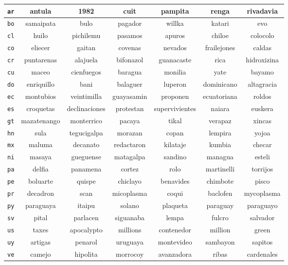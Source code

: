 \begin{tabular}{lcccccc}
    \toprule
    \texttt{ar} & antula & 1982 & cuit & pampita & renga & rivadavia \\ 
    \midrule
    \texttt{bo} & samaipata & bulo & pagador & willka & katari & evo \\ 
    \midrule
    \texttt{cl} & huilo & pichilemu & pasamos & apuros & chiloe & colocolo \\ 
    \midrule
    \texttt{co} & eliecer & gaitan & covenas & nevados & frailejones & caldas \\ 
    \midrule
    \texttt{cr} & puntarenas & alajuela & bifonazol & guanacaste & rica & hidroxizina \\ 
    \midrule
    \texttt{cu} & maceo & cienfuegos & baragua & monilia & yate & bayamo \\ 
    \midrule
    \texttt{do} & enriquillo & bani & balaguer & luperon & dominicano & altagracia \\ 
    \midrule
    \texttt{ec} & montubios & veintimilla & guayasamin & proponen & ecuatoriana & roldos \\ 
    \midrule
    \texttt{es} & croquetas & declinaciones & protestan & supervivientes & naiara & euskera \\ 
    \midrule
    \texttt{gt} & mazatenango & monterrico & pacaya & tikal & verapaz & xincas \\ 
    \midrule
    \texttt{hn} & sula & tegucigalpa & morazan & copan & lempira & yojoa \\ 
    \midrule
    \texttt{mx} & maluma & decanato & redactaron & kilataje & kumbia & checar \\ 
    \midrule
    \texttt{ni} & masaya & gueguense & matagalpa & sandino & managua & esteli \\ 
    \midrule
    \texttt{pa} & delfia & panamena & cortez & rolo & martinelli & torrijos \\ 
    \midrule
    \texttt{pe} & boluarte & quispe & chiclayo & benavides & chimbote & pisco \\ 
    \midrule
    \texttt{pr} & decadron & scan & micoplasma & coqui & baclofen & mycoplasma \\ 
    \midrule
    \texttt{py} & paraguaya & itaipu & solano & plaqueta & paraguay & paraguayo \\ 
    \midrule
    \texttt{sv} & pital & parlacen & siguanaba & lempa & fulcro & salvador \\ 
    \midrule
    \texttt{us} & taxes & apocalypto & millions & contenedor & million & green \\ 
    \midrule
    \texttt{uy} & artigas & penarol & uruguaya & montevideo & sambayon & sapitos \\ 
    \midrule
    \texttt{ve} & camejo & hipolita & morrocoy & avanzadora & ribas & cardenales \\ 
    \midrule
    \bottomrule
\end{tabular}
    